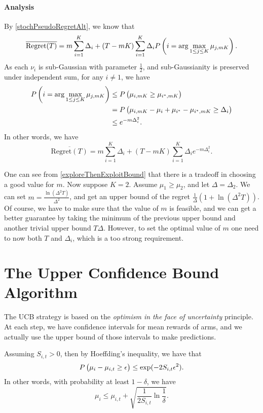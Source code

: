 \documentclass[openany]{book}
\theoremstyle{definition}
\theoremstyle{remark}
\begin{document}
\paragraph{Analysis}
By \eqref{stochPseudoRegretAlt}, we know that
\begin{equation*}
    \overline{\mathrm{Regret}(T)}=m \sum_{i=1}^{K}\Delta_i+(T-mK)\sum_{i=1}^{K}\Delta_iP\del{i=\arg\max_{1\le j\le K}\mu_{j,mK}}.
\end{equation*}
As each $\nu_i$ is sub-Gaussian with parameter $\frac{1}{2}$, and sub-Gaussianity is preserved under independent sum, for any $i\ne1$, we have
\begin{align*}
    P\del{i=\arg\max_{1\le j\le K}\mu_{j,mK}} & \le P\del{\mu_{i,mK}\ge\mu_{i^*,mK}} \\
     & =P\del{\mu_{i,mK}-\mu_i+\mu_{i^*}-\mu_{i^*,mK}\ge\Delta_i} \\
     & \le e^{-m\Delta_i^2}.
\end{align*}
In other words, we have
\begin{equation}\label{exploreThenExploitBound}
    \overline{\mathrm{Regret}(T)}=m \sum_{i=1}^{K}\Delta_i+(T-mK)\sum_{i=1}^{K}\Delta_ie^{-m\Delta_i^2}.
\end{equation}

One can see from \eqref{exploreThenExploitBound} that there is a tradeoff in choosing a good value for $m$. Now suppose $K=2$. Assume $\mu_1\ge\mu_2$, and let $\Delta=\Delta_2$. We can set $m=\frac{\ln(\Delta^2T)}{\Delta^2}$, and get an upper bound of the regret $\frac{1}{\Delta}(1+\ln(\Delta^2T))$. Of course, we have to make sure that the value of $m$ is feasible, and we can get a better guarantee by taking the minimum of the previous upper bound and another trivial upper bound $T\Delta$. However, to set the optimal value of $m$ one need to now both $T$ and $\Delta_i$, which is a too strong requirement.

\section{The Upper Confidence Bound Algorithm}
The UCB strategy is based on the \emph{optimism in the face of uncertainty} principle. At each step, we have confidence intervals for mean rewards of arms, and we actually use the upper bound of those intervals to make predictions.

Assuming $S_{i,t}>0$, then by Hoeffding's inequality, we have that
\begin{equation*}
    P\del{\mu_i-\mu_{i,t}\ge\epsilon}\le\exp(-2S_{i,t}\epsilon^2).
\end{equation*}
In other words, with probability at least $1-\delta$, we have
\begin{equation*}
    \mu_i\le\mu_{i,t}+\sqrt{\frac{1}{2S_{i,t}}\ln \frac{1}{\delta}}.
\end{equation*}
\end{document}
